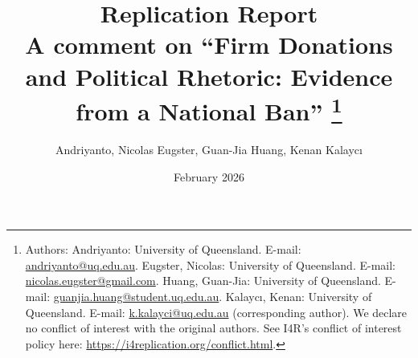 \documentclass[12pt,a4paper]{article}
\begin{document}
\date{February 2026}

\title{
\textbf{Replication Report} \\[0.25cm]
\textbf{A comment on ``Firm Donations and Political Rhetoric: Evidence from a National Ban''}%
%
 \thanks{
Authors:
Andriyanto: University of Queensland. E-mail: \href{mailto:andriyanto@uq.edu.au}{andriyanto@uq.edu.au}.
Eugster, Nicolas: University of Queensland. E-mail: \href{mailto:nicolas.eugster@gmail.com}{nicolas.eugster@gmail.com}.
Huang, Guan-Jia: University of Queensland. E-mail: \href{mailto:guanjia.huang@student.uq.edu.au}{guanjia.huang@student.uq.edu.au}.
Kalaycı, Kenan: University of Queensland. E-mail: \href{mailto:k.kalayci@uq.edu.au}{k.kalayci@uq.edu.au} (corresponding author).
We declare no conflict of interest with the original authors. See I4R's conflict of interest policy here: \url{https://i4replication.org/conflict.html}.}
}
\author{Andriyanto, Nicolas Eugster, Guan-Jia Huang, Kenan Kalaycı}

\maketitle
\end{document}
